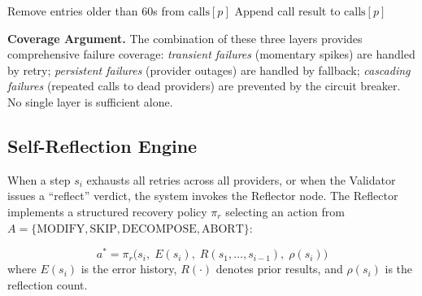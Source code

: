 \documentclass[conference]{IEEEtran}
\begin{document}
\begin{algorithm}[htbp]
    \caption{Circuit Breaker State Transition}
    \label{alg:circuit}
    Remove entries older than 60s from $\textrm{calls}[p]$\;
    Append call result to $\textrm{calls}[p]$\;
\end{algorithm}

\textbf{Coverage Argument.} The combination of these three layers provides comprehensive failure coverage: \textit{transient failures} (momentary spikes) are handled by retry; \textit{persistent failures} (provider outages) are handled by fallback; \textit{cascading failures} (repeated calls to dead providers) are prevented by the circuit breaker. No single layer is sufficient alone.

\subsection{Self-Reflection Engine}
\label{sec:reflection}

When a step $s_i$ exhausts all retries across all providers, or when the Validator issues a ``reflect'' verdict, the system invokes the Reflector node. The Reflector implements a structured recovery policy $\pi_r$ selecting an action from $A = \{\textrm{MODIFY}, \textrm{SKIP}, \textrm{DECOMPOSE}, \textrm{ABORT}\}$:

\begin{equation}
    a^* = \pi_r\big(s_i,\; E(s_i),\; R(s_1, \ldots, s_{i-1}),\; \rho(s_i)\big)
\end{equation}
where $E(s_i)$ is the error history, $R(\cdot)$ denotes prior results, and $\rho(s_i)$ is the reflection count.
\end{document}
